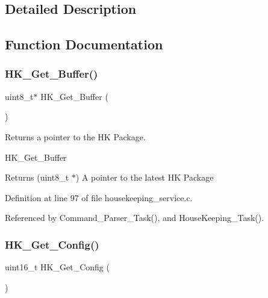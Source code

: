 \subsection{Detailed Description}


\subsection{Function Documentation}
\mbox{\label{group___h_k___service_ga18db64c11f8d6334b8e954d70da0045e}} 
\subsubsection{\texorpdfstring{H\+K\+\_\+\+Get\+\_\+\+Buffer()}{HK\_Get\_Buffer()}}
{\footnotesize\ttfamily uint8\+\_\+t$\ast$ H\+K\+\_\+\+Get\+\_\+\+Buffer (\begin{DoxyParamCaption}{ }\end{DoxyParamCaption})}



Returns a pointer to the HK Package. 

H\+K\+\_\+\+Get\+\_\+\+Buffer

\begin{DoxyReturn}{Returns}
(uint8\+\_\+t $\ast$) A pointer to the latest HK Package 
\end{DoxyReturn}


Definition at line 97 of file housekeeping\+\_\+service.\+c.



Referenced by Command\+\_\+\+Parser\+\_\+\+Task(), and House\+Keeping\+\_\+\+Task().

\mbox{\label{group___h_k___service_ga8f8a150f9356f9acaa04e0fa6845c665}} 
\subsubsection{\texorpdfstring{H\+K\+\_\+\+Get\+\_\+\+Config()}{HK\_Get\_Config()}}
{\footnotesize\ttfamily uint16\+\_\+t H\+K\+\_\+\+Get\+\_\+\+Config (\begin{DoxyParamCaption}{ }\end{DoxyParamCaption})}



